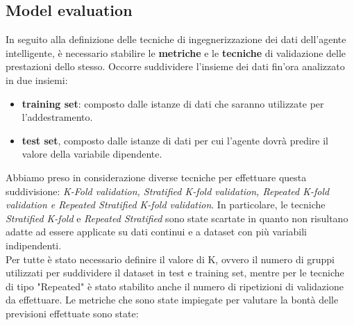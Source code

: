 \subsection{Model evaluation}
\fancyhead{}    %

In seguito alla definizione delle tecniche di ingegnerizzazione dei dati dell’agente intelligente, è necessario stabilire le \textbf{metriche} e le \textbf{tecniche} di validazione delle prestazioni dello
stesso. Occorre suddividere l’insieme dei dati fin’ora analizzato in due insiemi: 
\begin{itemize}
\item \textbf{training set}:
composto dalle istanze di dati che saranno utilizzate per l’addestramento.
\item \textbf{test set}, composto dalle istanze di dati per cui l’agente dovrà predire il valore della variabile dipendente.
\end{itemize}
Abbiamo preso in considerazione diverse tecniche per effettuare questa suddivisione: \textit{K-Fold
validation, Stratified K-fold validation, Repeated K-fold validation e Repeated Stratified
K-fold validation}. In particolare, le tecniche \textit{Stratified K-fold} e \textit{Repeated Stratified} sono state
scartate in quanto non risultano adatte ad essere applicate su dati continui e a dataset con più
variabili indipendenti. \\ 
Per tutte è stato necessario definire il valore di K, ovvero il numero
di gruppi utilizzati per suddividere il dataset in test e training set, mentre per le tecniche di tipo "Repeated" è stato stabilito anche il numero di
ripetizioni di validazione da effettuare. Le metriche che sono state impiegate per valutare la bontà delle
previsioni effettuate sono state: